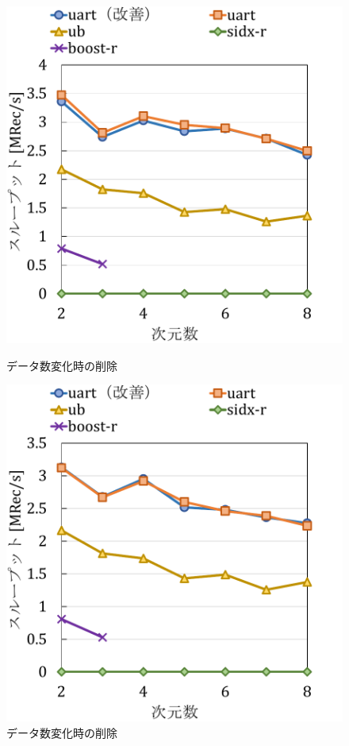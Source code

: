 \begin{figure}[tb]
  \begin{minipage}[c]{0.495\textwidth}
    \centering
    \includegraphics[scale=0.5]{./figures/graph-dimention-delete-0.pdf}
    \caption{データ数変化時の削除}
    \label{graph:grouped}
  \end{minipage}
  \begin{minipage}[c]{0.495\textwidth}
    \centering
    \includegraphics[scale=0.5]{./figures/graph-dimention-delete-0.5.pdf}
    \caption{データ数変化時の削除}
    \label{graph:paired}
  \end{minipage}
\end{figure}

